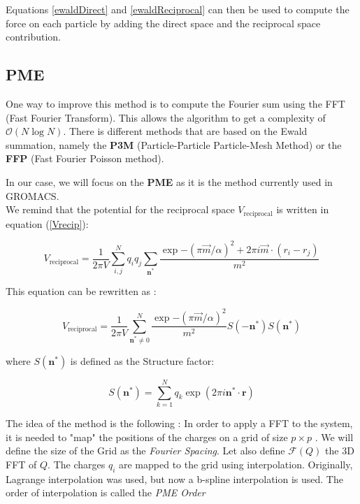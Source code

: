 \documentclass[11pt,twoside,a4paper]{report}
\begin{document}
Equations \ref{ewaldDirect} and \ref{ewaldReciprocal} can then be used to compute the force on each particle by adding the direct space and the reciprocal space contribution.\\


\subsection{PME}

One way to improve this method is to compute the Fourier sum using the FFT (Fast Fourier Transform). This allows the algorithm to get a complexity of $\mathcal{O}(N\log N)$. There is different methods that are based on the Ewald summation, namely the \textbf{P3M} (Particle-Particle Particle-Mesh Method) or the \textbf{FFP} (Fast Fourier Poisson method). 

In our case, we will focus on the \textbf{PME} as it is the method currently used in GROMACS. \\

We remind that the potential for the reciprocal space $V_{\text{reciprocal}}$ is written in equation (\ref{Vrecip}):


\begin{equation*}
    V_{\text{reciprocal}} =\frac{1}{2 \pi V} \sum\limits_{i,j}^{N} q_i q_j \sum\limits_{\textbf{n}^*} \frac{\exp{-(\pi \overrightarrow{m}/\alpha)^2} +2\pi i \overrightarrow{m} \cdot (r_i - r_j)}{m^2}    
\end{equation*}



This equation can be rewritten as :

\begin{equation*}
    V_{\text{reciprocal}} =\frac{1}{2 \pi V} \sum\limits_{\textbf{n}^* \neq 0}^{N}  \frac{\exp{-(\pi \overrightarrow{m}/\alpha)^2}}{m^2}S(-\textbf{n}^* )S(\textbf{n}^* )
\end{equation*}

where $S(\textbf{n}^* )$ is defined as the Structure factor:

\begin{equation}
    S(\textbf{n}^* ) = \sum\limits_{k=1}^{N} {q_k \exp(2 \pi i \textbf{n}^* \cdot \textbf{r}) }
\end{equation}


The idea of the method is the following : In order to apply a FFT to the system, it is needed to "map" the positions of the charges on a grid of size $ p \times p $ . We will define the size of the Grid as the \textit{Fourier Spacing}. Let also define $\mathcal{F}(Q)$ the 3D FFT of $Q$. The charges $q_i$ are mapped to the grid using interpolation. 
Originally, Lagrange interpolation was used, but now a b-spline interpolation is used. The order of interpolation is called the \textit{PME Order}\\
\end{document}
